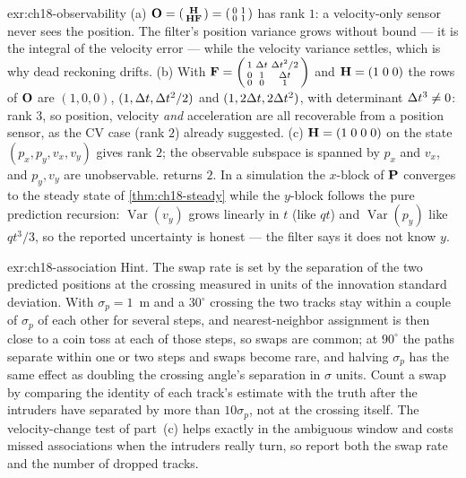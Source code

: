 \begin{solution}{exr:ch18-observability}
(a) $\mathbf{O}=\begin{psmallmatrix}\mathbf{H}\\ \mathbf{H}\mathbf{F}\end{psmallmatrix}=\begin{psmallmatrix}0&1\\0&1\end{psmallmatrix}$ has rank $1$: a velocity-only sensor never sees the position. The filter's position variance grows without bound --- it is the integral of the velocity error --- while the velocity variance settles, which is why dead reckoning drifts. (b) With $\mathbf{F}=\begin{psmallmatrix}1&\Delta t&\Delta t^2/2\\0&1&\Delta t\\0&0&1\end{psmallmatrix}$ and $\mathbf{H}=(1\;0\;0)$ the rows of $\mathbf{O}$ are $(1,0,0)$, $(1,\Delta t,\Delta t^2/2)$ and $(1,2\Delta t,2\Delta t^2)$, with determinant $\Delta t^3\neq0$: rank $3$, so position, velocity \emph{and} acceleration are all recoverable from a position sensor, as the CV case (rank $2$) already suggested. (c) $\mathbf{H}=(1\;0\;0\;0)$ on the state $(p_x,p_y,v_x,v_y)$ gives rank $2$; the observable subspace is spanned by $p_x$ and $v_x$, and $p_y,v_y$ are unobservable.  returns $2$. In a simulation the $x$-block of $\mathbf{P}$ converges to the steady state of \cref{thm:ch18-steady} while the $y$-block follows the pure prediction recursion: $\operatorname{Var}(v_y)$ grows linearly in $t$ (like $qt$) and $\operatorname{Var}(p_y)$ like $qt^3/3$, so the reported uncertainty is honest --- the filter says it does not know $y$.
\end{solution}

\begin{solution}{exr:ch18-association}
Hint. The swap rate is set by the separation of the two predicted positions at the crossing measured in units of the innovation standard deviation. With $\sigma_p=1$~m and a $30^\circ$ crossing the two tracks stay within a couple of $\sigma_p$ of each other for several steps, and nearest-neighbor assignment is then close to a coin toss at each of those steps, so swaps are common; at $90^\circ$ the paths separate within one or two steps and swaps become rare, and halving $\sigma_p$ has the same effect as doubling the crossing angle's separation in $\sigma$ units. Count a swap by comparing the identity of each track's estimate with the truth after the intruders have separated by more than $10\sigma_p$, not at the crossing itself. The velocity-change test of part~(c) helps exactly in the ambiguous window and costs missed associations when the intruders really turn, so report both the swap rate and the number of dropped tracks.
\end{solution}

